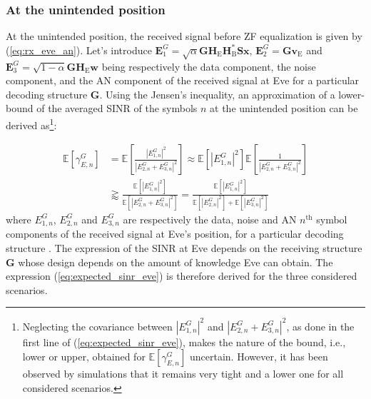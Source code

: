 \documentclass[12pt, draftclsnofoot, onecolumn]{IEEEtran}
\newcommand{\EX}[1]{\mathbb{E} \left[#1\right]}%
\newcommand{\HE}{\textbf{H}_{\text{E}}}
\newcommand{\HB}{\textbf{H}_{\text{B}}}
\newcommand{\spread}{\textbf{S}}
\newcommand{\w}{\textbf{w}}
\newcommand{\mat}[1]{\boldsymbol{\mathrm{#1}}}
\begin{document}
\subsubsection{At the unintended position}
At the unintended position, the received signal before ZF equalization is given by (\ref{eq:rx_eve_an}). Let's introduce $\textbf{E}_1^G = \sqrt{\alpha}  \textbf{G} \HE \HB^* \spread\textbf{x} $, $\textbf{E}_2^G = \textbf{G}  \textbf{v}_\text{E}$ and $\textbf{E}_3^G = \sqrt{1-\alpha} \textbf{G} \HE \w$ being respectively the data component, the noise component, and the AN component of the received signal at Eve  for a particular decoding structure $\textbf{G}$. Using the Jensen's inequality, an approximation of a lower-bound of the averaged SINR of the symbols $n$ at the unintended position can be derived as\footnote{Neglecting the covariance between $\left|E_{1,n}^G\right|^2$ and $\left| E_{2,n}^G + E_{3,n}^G \right|^2$, as  done in the first line of (\ref{eq:expected_sinr_eve}), makes the nature of the bound, i.e., lower or upper, obtained for $\EX{\gamma_{E,n}^G}$ uncertain. However, it has been observed by simulations that it remains very tight and a lower one for all considered scenarios.}:

\begin{equation}
\begin{split}
\EX{\gamma_{E,n}^G} &= \EX{  \frac{ \left| E_{1,n}^G \right|^2  }{ \left| E_{2,n}^G + E_{3,n}^G \right|^2 } }  \approx  \EX{ \left| E_{1,n}^G \right|^2 }  \EX{ \frac{1}{ \left| E_{2,n}^G + E_{3,n}^G \right|^2} }  \\
& \gtrapprox \frac{\EX{   \left| E_{1,n}^G \right|^2  } }{\EX{ \left| E_{2,n}^G + E_{3,n}^G \right|^2  }} =  \frac{\EX{  \left| E_{1,n}^G \right|^2  } }{\EX{  \left| E_{2,n}^G \right|^2  } +  \EX{  \left|E_{3,n}^G \right|^2  }}
\label{eq:expected_sinr_eve}
\end{split}
\end{equation}
where $E_{1,n}^G$, $E_{2,n}^G$ and $E_{3,n}^G$ are respectively the data, noise and AN $n^{\text{th}}$ symbol components of the received signal at Eve's position, for a particular decoding structure \mat{G}. The expression of the SINR at Eve depends on the receiving structure $\textbf{G}$ whose design depends on the amount of knowledge Eve can obtain. The expression (\ref{eq:expected_sinr_eve}) is therefore derived for  the three considered scenarios.
\end{document}
